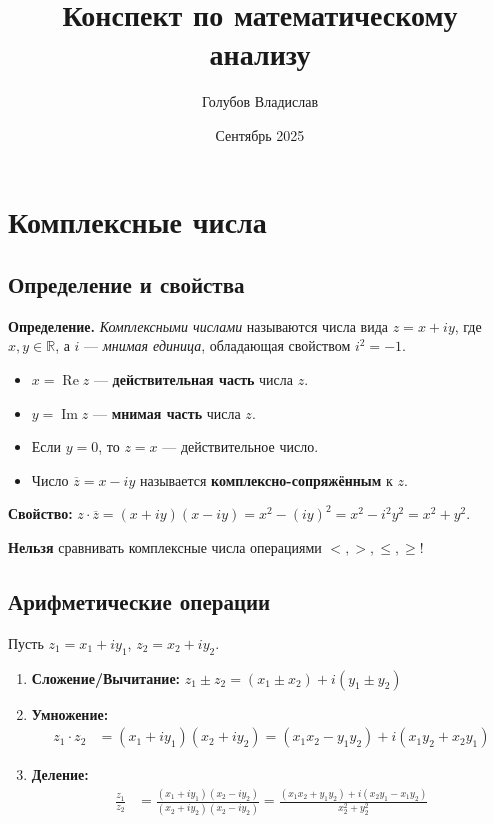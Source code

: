 \documentclass[12pt, paper]{article}
\title{Конспект по математическому анализу}
\author{Голубов Владислав}
\date{Сентябрь 2025}
\newcommand{\R}{\mathbb{R}}
\begin{document}
\maketitle
\tableofcontents
\newpage

\section{Комплексные числа}
\subsection{Определение и свойства}
\begin{tcolorbox}
\textbf{Определение.} \textit{Комплексными числами} называются числа вида $z = x + iy$, где $x, y \in \R$, а $i$ — \textit{мнимая единица}, обладающая свойством $i^2 = -1$.
\end{tcolorbox}
\begin{itemize}
    \item $x = \operatorname{Re } z$ — \textbf{действительная часть} числа $z$.
    \item $y = \operatorname{Im } z$ — \textbf{мнимая часть} числа $z$.
    \item Если $y = 0$, то $z = x$ — действительное число.
    \item Число $\overline{z} = x - iy$ называется \textbf{комплексно-сопряжённым} к $z$.
\end{itemize}

\begin{tcolorbox}
\textbf{Свойство:} $z \cdot \overline{z} = (x + iy)(x - iy) = x^2 - (iy)^2 = x^2 - i^2y^2 = x^2 + y^2$.
\end{tcolorbox}

\begin{tcolorbox}[title=Важное примечание]
\textbf{Нельзя} сравнивать комплексные числа операциями $<, >, \leq, \geq$!
\end{tcolorbox}

\subsection{Арифметические операции}
Пусть $z_1 = x_1 + iy_1$, $z_2 = x_2 + iy_2$.
\begin{enumerate}
    \item \textbf{Сложение/Вычитание:}
    $z_1 \pm z_2 = (x_1 \pm x_2) + i(y_1 \pm y_2)$
    \item \textbf{Умножение:}
    \begin{align*}
    z_1 \cdot z_2 &= (x_1 + iy_1)(x_2 + iy_2) = (x_1x_2 - y_1y_2) + i(x_1y_2 + x_2y_1)
    \end{align*}
    \item \textbf{Деление:}
    \begin{align*}
    \frac{z_1}{z_2} &= \frac{(x_1 + iy_1)(x_2 - iy_2)}{(x_2 + iy_2)(x_2 - iy_2)} = \frac{(x_1x_2 + y_1y_2) + i(x_2y_1 - x_1y_2)}{x_2^2 + y_2^2}\\
    \end{align*}
\end{enumerate}
\end{document}
